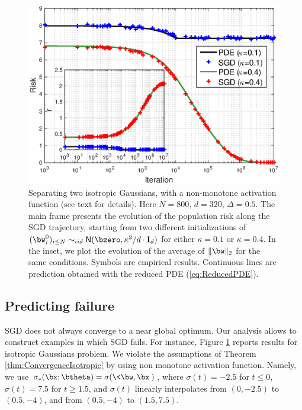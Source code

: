 \documentclass[11pt]{article}
\renewcommand{\eqref}[1]{(\ref{#1})}
\begin{document}
\begin{figure}[t!]
\begin{center}
\includegraphics[width=0.9\linewidth]{isoPDE_pwlinear_J100_d320_n800_Delta50_step10.eps}
\end{center}
\caption{Separating two isotropic Gaussians, with a non-monotone activation function (see text for details). Here $N=800$, $d=320$, $\Delta=0.5$.
The main frame presents the evolution of the population risk along the SGD trajectory, starting from two different initializations of $(\bw_i^0)_{i \le N} \sim_{iid}\mathsf{N}(\bzero,\kappa^2/d\cdot \mathbf{I}_d)$ for either $\kappa=0.1$ or $\kappa=0.4$. In the inset,
we plot the evolution of the average of $\|\bw\|_2$ for the same conditions. Symbols are empirical results. Continuous lines are prediction obtained with the reduced PDE \eqref{eq:ReducedPDE}.
\label{fig:Failure}}
\end{figure}

\subsection{Predicting failure}

SGD does not always converge to a near global optimum. 
Our analysis allows to construct examples in which SGD fails. For instance,
Figure \ref{fig:Failure} reports results for isotropic Gaussians problem. We violate the assumptions of Theorem \ref{thm:ConvergenceIsotropic}
by using non monotone activation function. Namely, we use $\sigma_*(\bx;\btheta) = \sigma(\<\bw,\bx\>)$,
where $\sigma(t) = -2.5$ for $t\leq 0$, $\sigma(t) = 7.5$ for $t\geq 1.5$, and $\sigma(t)$ linearly interpolates from $(0,-2.5)$ to $(0.5,-4)$, and from $(0.5,-4)$ to $(1.5,7.5)$.
\end{document}
